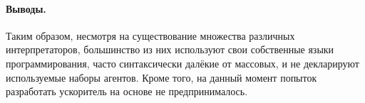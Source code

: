 


\paragraph{Выводы.}

Таким образом, несмотря на существование множества различных интерпретаторов, большинство из них используют свои собственные языки программирования, часто синтаксически далёкие от массовых, и не декларируют используемые наборы агентов.
Кроме того, на данный момент попыток разработать ускоритель на основе \INs{} не предпринималось.
